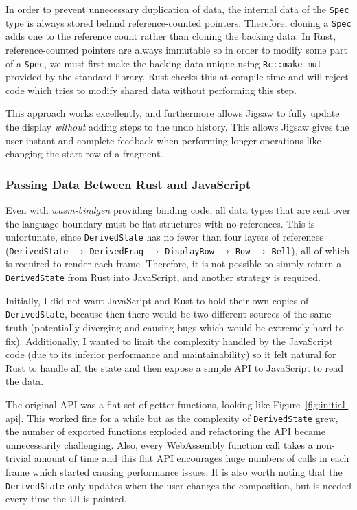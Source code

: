 \documentclass[12pt]{article}
\begin{document}
In order to prevent unnecessary duplication of data, the internal data of the \verb|Spec| type is
always stored behind reference-counted pointers.  Therefore, cloning a \verb|Spec| adds one to the
reference count rather than cloning the backing data.  In Rust, reference-counted pointers are
always immutable so in order to modify some part of a \verb|Spec|, we must first make the backing
data unique using
\verb|Rc::make_mut| provided by the standard library.  Rust checks this at compile-time and will
reject code which tries to modify shared data without performing this step.

This approach works excellently, and furthermore allows Jigsaw to fully update the display
\emph{without} adding steps
to the undo history.  This allows Jigsaw gives the user instant and complete feedback when
performing longer operations like changing the start row of a fragment.

\subsubsection{Passing Data Between Rust and JavaScript}

Even with \emph{wasm-bindgen} providing binding code, all data types that are sent over the
language boundary must be flat structures with no references.  This is unfortunate, since
\verb|DerivedState| has no fewer than four layers of references (\verb|DerivedState| $\to$ \verb|DerivedFrag| $\to$
\verb|DisplayRow| $\to$ \verb|Row| $\to$ \verb|Bell|), all of which is required to render each
frame.  Therefore, it is not possible to simply return a \verb|DerivedState| from Rust into
JavaScript, and another strategy is required.

Initially, I did not want JavaScript and Rust to hold their own copies of \verb|DerivedState|,
because then there would be two different sources of the same truth (potentially diverging and causing
bugs which would
be extremely hard to fix).  Additionally, I wanted to limit the complexity handled by the JavaScript
code (due to its inferior performance and maintainability) so it felt natural for Rust to handle all
the state and then expose a simple API to JavaScript to read the data.

The original API was a flat set of getter functions, looking like Figure~\ref{fig:initial-api}.
This worked fine for a while but as the complexity of \verb|DerivedState| grew, the number of
exported functions exploded and refactoring the API became unnecessarily challenging.  Also, every
WebAssembly function call takes a non-trivial amount of time and this flat API encourages huge
numbers of calls in each frame which started causing performance issues.  It is also worth noting
that the \verb|DerivedState| only updates when the user changes the composition, but is needed every
time the UI is painted.
\end{document}
